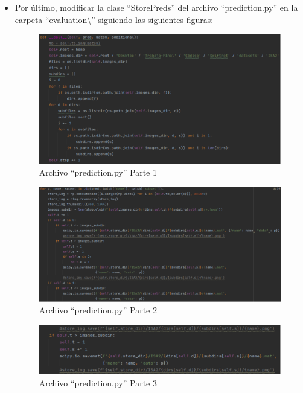 \begin{itemize}
\item Por último, modificar la clase ``StorePreds'' del archivo ``prediction.py'' en la carpeta ``evaluation\textbackslash{}'' siguiendo las siguientes figuras:

\begin{figure}[H]
  \centering
  \includegraphics[width=16cm]{Figuras/prediction.py_1.eps}
  \caption{Archivo ``prediction.py'' Parte 1}
\end{figure}

\begin{figure}[H]
  \centering
  \includegraphics[width=16cm]{Figuras/prediction.py_2.eps}
  \caption{Archivo ``prediction.py'' Parte 2}
\end{figure}

\begin{figure}[H]
  \centering
  \includegraphics[width=16cm]{Figuras/prediction.py_3.eps}
  \caption{Archivo ``prediction.py'' Parte 3}
\end{figure}


\end{itemize}
